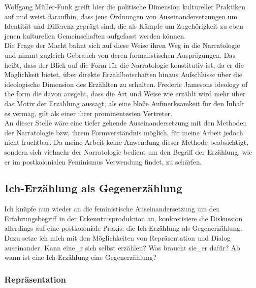   Wolfgang Müller-Funk greift hier die politische Dimension kultureller
  Praktiken auf und weist daraufhin, dass jene Ordnungen von
  Auseinandersetzungen um Identität und Differenz geprägt sind, die als Kämpfe
  um Zugehörigkeit zu eben jenen kulturellen Gemeinschaften aufgefasst werden
  können. \\
  Die Frage der Macht bahnt sich auf diese Weise ihren Weg in die
  Narratologie und nimmt zugleich Gebrauch von deren formalistischen
  Ausprägungen. Das heißt, dass der Blick auf die Form für die Narratologie
  konstitutiv ist, da er die Möglichkeit bietet, über direkte Erzählbotschaften
  hinaus Aufschlüsse über die ideologische Dimension des Erzählten zu erhalten.
  Frederic Jamesons ideology of the form die davon ausgeht, dass die Art und
  Weise wie erzählt wird mehr über das Motiv der Erzählung aussagt, als eine
  bloße Aufmerksamkeit für den Inhalt es vermag, gilt als einer ihrer
  prominentesten Vertreter.\\

  \noindent An dieser Stelle wäre eine tiefer gehende
  Auseinandersetzung mit den Methoden der Narratologie bzw. ihrem
  Formverständnis möglich, für meine Arbeit jedoch nicht fruchtbar. Da meine
  Arbeit keine Anwendung dieser Methode beabsichtigt, sondern sich vielmehr der
  Narratologie bedient um den Begriff der Erzählung, wie er im postkolonialen
  Feminismus Verwendung findet, zu schärfen.

  \subsection{Ich-Erzählung als Gegenerzählung}

  Ich knüpfe nun wieder an die feministische Auseinandersetzung um den
  Erfahrungsbegriff in der Erkenntnisproduktion an, konkretisiere die
  Diskussion allerdings auf eine postkoloniale Praxis: die Ich-Erzählung als
  Gegenerzählung. Dazu setze ich mich mit den Möglichkeiten von Repräsentation
  und Dialog auseinander. Kann eine\_r sich selbst erzählen? Was braucht sie\_er
  dafür? Ab wann ist eine Ich-Erzählung eine Gegenerzählung?

  \subsubsection{Repräsentation}

